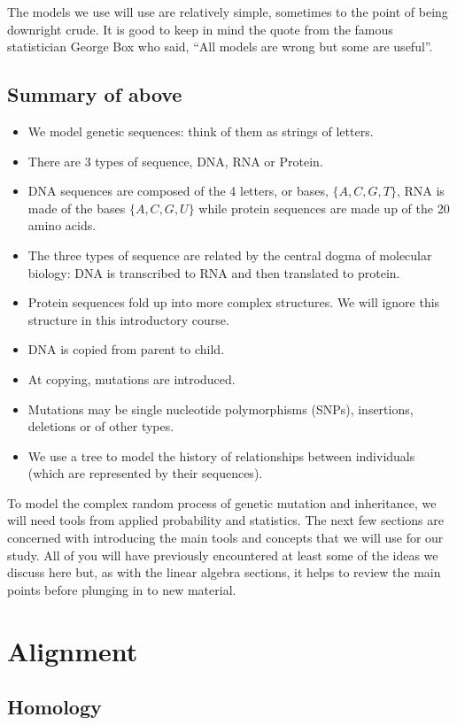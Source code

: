 \documentclass[11pt]{article}
\begin{document}
The models we use will use are relatively simple, sometimes to the point of being downright crude.  It is good to keep in mind the quote from the famous statistician George Box who said, ``All models are wrong but some are useful''.

\subsection{Summary of above} 
\begin{itemize}
\item We model genetic sequences: think of them as strings of letters.
\item There are 3 types of sequence, DNA, RNA or Protein.
\item DNA sequences are composed of the 4 letters, or bases, $ \{A, C, G, T \}$,  RNA is made of the bases $\{A,C,G,U\}$ while protein sequences are made up of the 20 amino acids. 
\item The three types of sequence are related by the central dogma of molecular biology: DNA is transcribed to RNA and then translated to protein.  
\item Protein sequences fold up into more complex structures.  We will ignore this structure in this introductory course.
\item DNA is copied from parent to child.  
\item At copying, mutations are introduced. 
\item Mutations may be single nucleotide polymorphisms (SNPs), insertions, deletions or of other types.
\item We use a tree to  model the history of relationships between individuals (which are represented by their sequences).
\end{itemize}


To model  the complex random process of genetic mutation and inheritance, we will need  tools from applied probability and statistics.  The next few sections are concerned with introducing the main tools and concepts that we will use for our study.  All of you will have previously encountered at least some of the ideas we discuss here  but, as with the linear algebra sections, it helps to review the main points before plunging in to new material.


\section{Alignment}
\label{sec:align}
\subsection{Homology}
\end{document}
